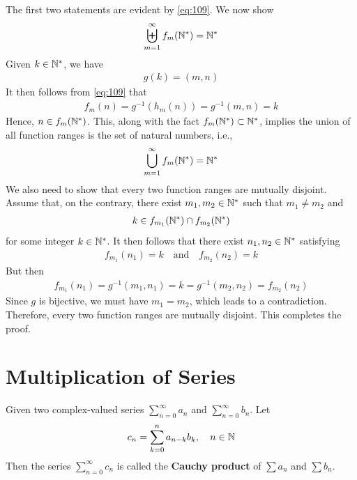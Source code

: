 \documentclass[thmcnt=section, 12pt]{my-elegantbook}
\begin{document}
\begin{solution}
    The first two statements are evident by \eqref{eq:109}. We now show 
    \begin{align*}
        \biguplus_{m=1}^\infty f_m(\mathbb{N}^\ast) = \mathbb{N}^\ast
    \end{align*}
    Given $k \in \mathbb{N}^\ast$, we have
    \begin{align*}
        g(k) = (m, n)
    \end{align*}
    It then follows from \eqref{eq:109} that 
    \begin{align*}
        f_m(n) = g^{-1}(h_m(n))
        = g^{-1}(m,n)
        = k
    \end{align*}
    Hence, $n \in f_m(\mathbb{N}^\ast)$. This, along with the fact $f_m(\mathbb{N}^\ast) \subset \mathbb{N}^\ast$, implies the union of all function ranges is the set of natural numbers, i.e., 
    \begin{align*}
        \bigcup_{m=1}^\infty f_m(\mathbb{N}^\ast) = \mathbb{N}^\ast
    \end{align*}
    We also need to show that every two function ranges are mutually disjoint. Assume that, on the contrary, there exist $m_1, m_2 \in \mathbb{N}^\ast$ such that $m_1 \neq m_2$ and
    \begin{align*}
        k \in f_{m_1}(\mathbb{N}^\ast) \cap f_{m_2}(\mathbb{N}^\ast)
    \end{align*}
    for some integer $k \in \mathbb{N}^\ast$. It then follows that there exist $n_1, n_2 \in \mathbb{N}^\ast$ satisfying
    \begin{align*}
        f_{m_1}(n_1) = k
        \quad \text{and} \quad
        f_{m_2}(n_2) = k
    \end{align*}
    But then
    \begin{align*}
        f_{m_1}(n_1) 
        = g^{-1}(m_1, n_1) 
        = k
        = g^{-1}(m_2, n_2)
        = f_{m_2}(n_2)
    \end{align*}
    Since $g$ is bijective, we must have $m_1 = m_2$, which leads to a contradiction. Therefore, every two function ranges are mutually disjoint. This completes the proof.
\end{solution}


\section{Multiplication of Series}

\begin{definition}
    Given two complex-valued series $\sum_{n=0}^\infty a_n$ and $\sum_{n=0}^\infty b_n$. Let 
    \begin{align*}
        c_n = \sum_{k=0}^{n} a_{n-k} b_k,
        \quad n \in \mathbb{N}
    \end{align*}
    Then the series $\sum_{n=0}^\infty c_n$ is called the \textbf{Cauchy product} of $\sum a_n$ and $\sum b_n$.
\end{definition}
\end{document}

